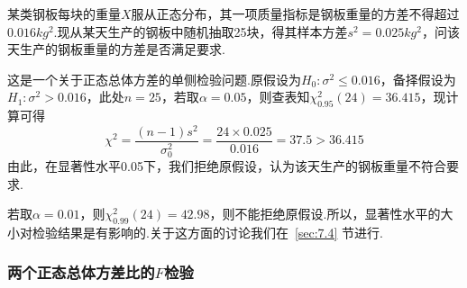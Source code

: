 \begin{example}\label{exam7.2.4}
	某类钢板每块的重量$X$服从正态分布，其一项质量指标是钢板重量的方差不得超过$0.016kg^{2}$.现从某天生产的钢板中随机抽取25块，得其样本方差$s^{2}=0.025kg^{2}$，问该天生产的钢板重量的方差是否满足要求.
\end{example}
\begin{solution}
	这是一个关于正态总体方差的单侧检验问题.原假设为$H _ { 0 } : \sigma ^ { 2 } \leq 0.016$，备择假设为$H _ { 1 } : \sigma ^ { 2 } > 0.016$，此处$n=25$，若取$\alpha=0.05$，则查表知$\chi _ { 0.95 } ^ { 2 } ( 24 ) = 36.415$，现计算可得
	\[\chi ^ { 2 } = \frac { ( n - 1 ) s ^ { 2 } } { \sigma _ { 0 } ^ { 2 } } = \frac { 24 \times 0.025 } { 0.016 } = 37.5 > 36.415\]
	由此，在显著性水平0.05下，我们拒绝原假设，认为该天生产的钢板重量不符合要求.
	
	若取$\alpha=0.01$，则$\chi _ { 0.99 } ^ { 2 } ( 24 ) = 42.98$，则不能拒绝原假设.所以，显著性水平的大小对检验结果是有影响的.关于这方面的讨论我们在~\ref{sec:7.4} 节进行.
\end{solution}

\subsubsection{两个正态总体方差比的$F$检验}

